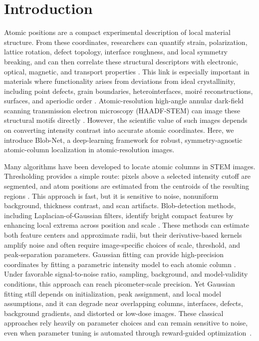 \section{Introduction}

Atomic positions are a compact experimental description of local material structure. From these coordinates, researchers can quantify strain, polarization, lattice rotation, defect topology, interface roughness, and local symmetry breaking, and can then correlate these structural descriptors with electronic, optical, magnetic, and transport properties \cite{Kalinin2022,Lee2020,Ziatdinov2017,krivanek2010atom}. This link is especially important in materials where functionality arises from deviations from ideal crystallinity, including point defects, grain boundaries, heterointerfaces, moir\'e reconstructions, surfaces, and aperiodic order \cite{Jiang2019,Rhodes2019,Nuckolls2024}. Atomic-resolution high-angle annular dark-field scanning transmission electron microscopy (HAADF-STEM) can image these structural motifs directly \cite{nellist2000principles,pennycook2012seeing}. However, the scientific value of such images depends on converting intensity contrast into accurate atomic coordinates. Here, we introduce Blob-Net, a deep-learning framework for robust, symmetry-agnostic atomic-column localization in atomic-resolution images.

Many algorithms have been developed to locate atomic columns in STEM images. Thresholding provides a simple route: pixels above a selected intensity cutoff are segmented, and atom positions are estimated from the centroids of the resulting regions \cite{Otsu1979Threshold}. This approach is fast, but it is sensitive to noise, nonuniform background, thickness contrast, and scan artifacts. Blob-detection methods, including Laplacian-of-Gaussian filters, identify bright compact features by enhancing local extrema across position and scale \cite{Lindeberg1998FeatureDetection}. These methods can estimate both feature centers and approximate radii, but their derivative-based kernels amplify noise and often require image-specific choices of scale, threshold, and peak-separation parameters. Gaussian fitting can provide high-precision coordinates by fitting a parametric intensity model to each atomic column \cite{Nord2017Atomap,Nomura2024Bayesian}. Under favorable signal-to-noise ratio, sampling, background, and model-validity conditions, this approach can reach picometer-scale precision. Yet Gaussian fitting still depends on initialization, peak assignment, and local model assumptions, and it can degrade near overlapping columns, interfaces, defects, background gradients, and distorted or low-dose images. These classical approaches rely heavily on parameter choices and can remain sensitive to noise, even when parameter tuning is automated through reward-guided optimization~\cite{Barakati2026Rewards}.

